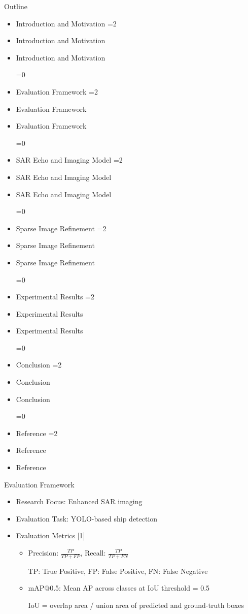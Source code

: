 \documentclass[aspectratio=169, 11pt]{beamer}
\newcommand{\dsrlabActiveSec}{0}
\newcommand{\dsrlaboutlineitem}[2]{%
  \ifnum\dsrlabActiveSec=0
    \item #2
  \else
    \ifnum#1=\dsrlabActiveSec
      \item #2
    \else
      \item {\color{dsrlabGrayLabel}#2}
    \fi
  \fi
}
\newcommand{\dsrlabSectionOutline}[1]{%
  \renewcommand{\dsrlabActiveSec}{#1}%
  \begin{frame}{Outline}
    \begin{itemize}
      \dsrlaboutlineitem{1}{Introduction and Motivation}
      \dsrlaboutlineitem{2}{Evaluation Framework}
      \dsrlaboutlineitem{3}{SAR Echo and Imaging Model}
      \dsrlaboutlineitem{4}{Sparse Image Refinement}
      \dsrlaboutlineitem{5}{Experimental Results}
      \dsrlaboutlineitem{6}{Conclusion}
      \dsrlaboutlineitem{7}{Reference}
    \end{itemize}
  \end{frame}
}
\begin{document}
\dsrlabSectionOutline{2}

\begin{frame}{Evaluation Framework}
  \begin{itemize}
    \item Research Focus: Enhanced SAR imaging
    \item Evaluation Task: YOLO-based ship detection
  \end{itemize}
  \hspace{-0.7cm}
  \resizebox{1.1\textwidth}{!}{}
  \vspace{-0.5cm}
  \begin{itemize}
    \item Evaluation Metrics [1]
    \begin{itemize}
      \item Precision: $\frac{TP}{TP+FP}$, Recall: $\frac{TP}{TP+FN}$

      {\footnotesize TP: True Positive, FP: False Positive, FN: False Negative}

      \item mAP@0.5: Mean AP across classes at IoU threshold = 0.5

      {\footnotesize IoU = overlap area / union area of predicted and ground-truth boxes}
    \end{itemize}
  \end{itemize}
\end{frame}
\end{document}
